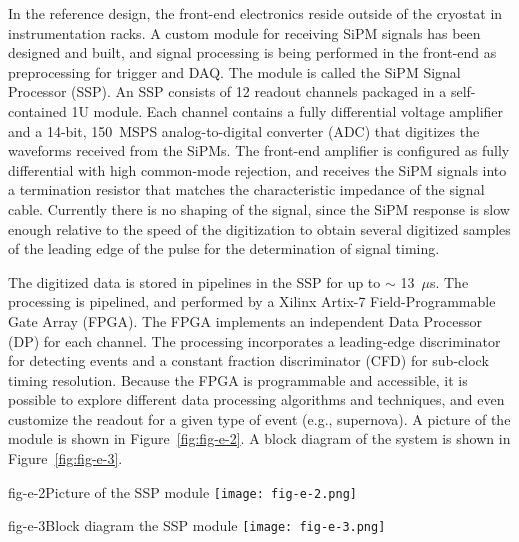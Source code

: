 In the reference design, the front-end electronics reside outside of
the cryostat in instrumentation racks.  A custom module for receiving
SiPM signals has been designed and built, and signal processing is
being performed in the front-end as preprocessing for trigger and DAQ.
The module is called the SiPM Signal Processor (SSP).  An SSP consists
of 12 readout channels packaged in a self-contained 1U module.  Each
channel contains a fully differential voltage amplifier and a 14-bit,
150~MSPS analog-to-digital converter (ADC) that digitizes the
waveforms received from the SiPMs.  The front-end amplifier is
configured as fully differential with high common-mode rejection, and
receives the SiPM signals into a termination resistor that matches the
characteristic impedance of the signal cable.  Currently there is no
shaping of the signal, since the SiPM response is slow enough relative
to the speed of the digitization to obtain several digitized samples
of the leading edge of the pulse for the determination of signal
timing.

The digitized data is stored in pipelines in the SSP for up to $\sim$
13~$\mu$s.  The processing is pipelined, and performed by a Xilinx
Artix-7 Field-Programmable Gate Array (FPGA).  The FPGA implements an
independent Data Processor (DP) for each channel.  The processing
incorporates a leading-edge discriminator for detecting events and a
constant fraction discriminator (CFD) for sub-clock timing resolution.
Because the FPGA is programmable and accessible, it is possible to
explore different data processing algorithms and techniques, and even
customize the readout for a given type of event (e.g., supernova).  A
picture of the module is shown in Figure~\ref{fig:fig-e-2}. 
A block diagram of the system is shown in Figure~\ref{fig:fig-e-3}.

\begin{cdrfigure}{fig-e-2}{Picture of the SSP module}
\texttt{[image: fig-e-2.png]}
\end{cdrfigure}

\begin{cdrfigure}{fig-e-3}{Block diagram the SSP module}
\texttt{[image: fig-e-3.png]}
\end{cdrfigure}

